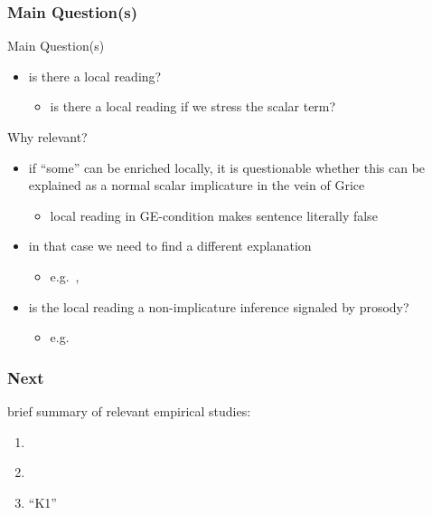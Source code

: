 \documentclass[fleqn,10pt,serif,xcolor=dvipsnames]{beamer}
\newcommand{\GE}{GE\xspace}
\begin{document}
\begin{frame}
  \frametitle{Main Question(s)}
  \begin{block}{Main Question(s)}
    \begin{itemize}
    \item is there a local reading?
      \begin{itemize}
      \item is there a local reading if we stress the scalar
        term?
      \end{itemize}
    \end{itemize}
  \end{block}

  \begin{block}{Why relevant?}
    \begin{itemize}
    \item if ``some'' can be enriched locally, it is questionable
      whether this can be explained as a normal scalar implicature in
      the vein of Grice
      \begin{itemize}
        \item local reading in \GE-condition makes sentence literally false
      \end{itemize}
    \item in that case we need to find a different explanation
      \begin{itemize}
       \item e.g.~\citet{Chierchia:2004_ScalarImplicatures},  \citet{ChierchiaFox2008:The-Grammatical}
      \end{itemize}
    \item is the local reading a non-implicature inference signaled by prosody?
      \begin{itemize}
      \item e.g.~\citet{Geurts2010:Quantity-Implic}
      \end{itemize}
    \end{itemize}
  \end{block}
\end{frame}

\begin{frame}
  \frametitle{Next}
  brief summary of relevant empirical studies:
  \begin{enumerate}
  \item \citet{GeurtsPouscoulous2009:Embedded-Implic}
  \item \citet{ChemlaSpector2010:Experimental-Ev}
  \item ``K1''
  \end{enumerate}
\end{frame}
\end{document}
